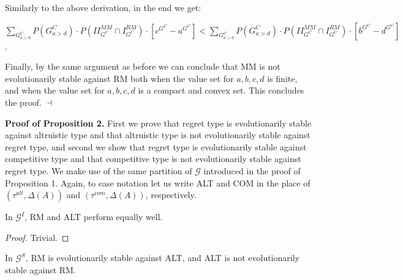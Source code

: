 \documentclass[fleqn,reqno,11pt]{article}
\begin{document}
\noindent Similarly to the above derivation, in the end we get: 

\medskip{}

\noindent $\sum_{G_{a>d}^{C}}P(G_{a>d}^{C})\cdot P(II_{G^{C}}^{MM}\cap I_{G^{C}}^{RM})\cdot[c^{G^{C}}-a^{G^{C}}]<\sum_{G_{a>d}^{C}}P(G_{a>d}^{C})\cdot P(II_{G^{C}}^{MM}\cap I_{G^{C}}^{RM})\cdot[b^{G^{C}}-d^{G^{C}}]$.

\medskip{}


\noindent Finally, by the same argument as before we can conclude that MM is
not evolutionarily stable against RM both when the value set for $a,b,c,d$
is finite, and when the value set for $a,b,c,d$ is a compact and
convex set. This concludes the proof. $\dashv$


\textbf{Proof of Proposition 2.} First we prove that regret type is evolutionarily stable against altruistic type and that altruistic type is not evolutionarily stable against regret type, and second we show that regret type is evolutionarily stable against competitive type and that competitive type is not evolutionarily stable against regret type. We make use of the same partition of $\mathcal{G}$ introduced in the proof of Proposition 1. Again, to ease notation let us write ALT and COM in the place of $(\tau^{alt}, \Delta(A))$ and $(\tau^{com}, \Delta(A))$, respectively.

\begin{lemma}
In $\mathcal{G}^I$, RM and ALT perform equally well.
\end{lemma}

\begin{proof}
Trivial.
\end{proof}

\begin{lemma}
In $\mathcal{G}^S$, RM is evolutionarily stable against ALT, and ALT is not evolutionarily stable against RM. 
\end{lemma}
\end{document}
